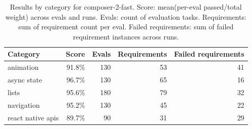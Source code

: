\begin{table}[htbp]
\centering
\begin{tabular}{lrrrr}
\toprule
Category & Score & Evals & Requirements & Failed requirements \\
\midrule
animation & 91.8\% & 130 & 53 & 41 \\
async state & 96.7\% & 130 & 65 & 16 \\
lists & 95.6\% & 180 & 79 & 32 \\
navigation & 95.2\% & 130 & 45 & 22 \\
react native apis & 89.7\% & 90 & 31 & 29 \\
\bottomrule
\end{tabular}
\caption{Results by category for composer-2-fast. Score: mean(per-eval passed/total weight) across evals and runs. Evals: count of evaluation tasks. Requirements: sum of requirement count per eval. Failed requirements: sum of failed requirement instances across runs.}
\end{table}
